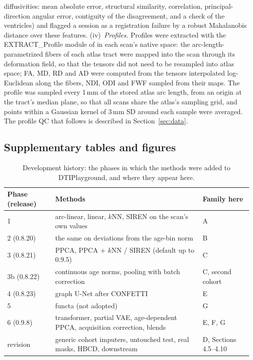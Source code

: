 \documentclass[11pt]{article}
\begin{document}
diffusivities: mean absolute error, structural similarity, correlation, principal-direction angular error, contiguity of the disagreement,
and a check of the ventricles) and flagged a session as a registration failure by a robust Mahalanobis distance over these
features. (iv)~\emph{Profiles.} Profiles were extracted with the EXTRACT\_Profile module of 
in each scan's native space: the arc-length-parametrized fibers of each atlas tract were mapped into the scan through
its deformation field, so that the tensors did not need to be resampled into atlas space; FA, MD, RD and AD were computed
from the tensors interpolated log-Euclidean along the fibers, NDI, ODI and FWF sampled from their maps. The profile was
sampled every 1\,mm of the stored atlas arc length, from an origin at the tract's median plane, so that all scans share the
atlas's sampling grid, and points within a Gaussian kernel of 3\,mm SD around each sample were averaged.
The profile QC that follows is described in Section~\ref{sec:data}.

\subsection{Supplementary tables and figures}


\begin{table}[h]
\centering\footnotesize
\caption{Development history: the phases in which the methods were added to DTIPlayground, and where they appear
here.}\label{tab:phases}
\begin{tabular}{lp{9.5cm}p{3.2cm}}
\toprule
Phase (release) & Methods & Family here \\
\midrule
1 & arc-linear, linear, $k$NN, SIREN on the scan's own values & A \\
2 (0.8.20) & the same on deviations from the age-bin norm & B \\
3 (0.8.21) & PPCA, PPCA + $k$NN / SIREN (default up to 0.9.5) & C \\
3b (0.8.22) & continuous age norms, pooling with batch correction & C, second cohort \\
4 (0.8.23) & graph U-Net after CONFETTI & E \\
5 & functa (not adopted) & G \\
6 (0.9.8) & transformer, partial VAE, age-dependent PPCA, acquisition correction, blends & E, F, G \\
revision & generic cohort imputers, untouched test, real masks, HBCD, downstream & D, Sections 4.5--4.10 \\
\bottomrule
\end{tabular}
\end{table}
\end{document}
